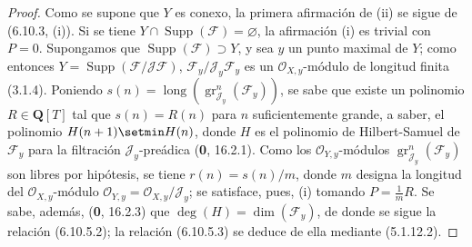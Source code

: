 \begin{proof}
Como se supone que $Y$ es conexo, la primera afirmación de (ii) se sigue de
(6.10.3, (i)). Si se tiene
$Y\cap\operatorname{Supp}(\mathcal F)=\varnothing$, la afirmación (i) es
trivial con $P=0$. Supongamos que
$\operatorname{Supp}(\mathcal F)\supset Y$, y sea $y$ un punto maximal de
$Y$; como entonces $Y=\operatorname{Supp}(\mathcal F/\mathcal J\mathcal F)$,
$\mathcal F_y/\mathcal J_y\mathcal F_y$ es un
$\mathcal O_{X,y}$-módulo de longitud finita (3.1.4). Poniendo
$s(n)=\operatorname{long}(\operatorname{gr}_{\mathcal J_y}^{n}(\mathcal F_y))$,
se sabe que existe un polinomio $R\in\mathbf Q[T]$ tal que $s(n)=R(n)$ para
$n$ suficientemente grande, a saber, el polinomio $H(n+1)\setmin H(n)$, donde $H$ es el polinomio
de Hilbert-Samuel de $\mathcal F_y$ para la filtración
$\mathcal J_y$-preádica (\textbf 0, 16.2.1). Como los
$\mathcal O_{Y,y}$-módulos
$\operatorname{gr}_{\mathcal J_y}^{n}(\mathcal F_y)$ son libres por
hipótesis, se tiene $r(n)=s(n)/m$, donde $m$ designa la longitud del
$\mathcal O_{X,y}$-módulo $\mathcal O_{Y,y}=\mathcal O_{X,y}/\mathcal J_y$; se satisface,
pues, (i)
tomando $P=\frac{1}{m}R$. Se sabe, además, (\textbf 0, 16.2.3) que
$\deg(H)=\dim(\mathcal F_y)$, de donde se sigue la relación (6.10.5.2); la relación
(6.10.5.3) se deduce de ella mediante (5.1.12.2).


\end{proof}

